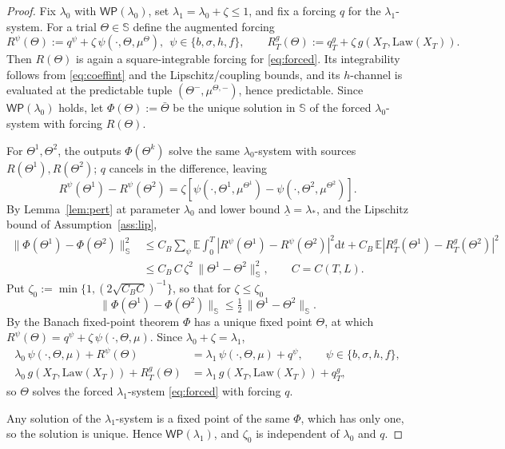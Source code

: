 \documentclass[preprint,12pt]{elsarticle}
\newcommand{\E}{\mathbb{E}}
\newcommand{\diff}{\mathrm{d}}
\newcommand{\Law}{\mathrm{Law}}
\newcommand{\HH}{\mathbb{S}}
\numberwithin{equation}{section}
\theoremstyle{plain}
\theoremstyle{definition}
\theoremstyle{\PaperRemarkStyle}
\begin{document}
\begin{proof}
Fix $\lambda_0$ with $\mathsf{WP}(\lambda_0)$, set $\lambda_1=\lambda_0+\zeta\le1$, and
fix a forcing $q$ for the $\lambda_1$-system. For a trial $\Theta\in\HH$ define the
augmented forcing
\[
R^\psi(\Theta):=q^\psi+\zeta\,\psi(\cdot,\Theta,\mu^\Theta),\ \ \psi\in\{b,\sigma,h,f\},
\qquad R^g_T(\Theta):=q^g_T+\zeta\,g(X_T,\Law(X_T)).
\]
Then $R(\Theta)$ is
again a square-integrable forcing for \eqref{eq:forced}. Its integrability follows from
\eqref{eq:coeffint} and the Lipschitz/coupling bounds, and its $h$-channel is evaluated at
the predictable tuple $(\Theta^-,\mu^{\Theta,-})$, hence predictable.
Since $\mathsf{WP}(\lambda_0)$ holds, let $\Phi(\Theta):=\bar\Theta$ be the unique
solution in $\HH$ of the forced $\lambda_0$-system with forcing $R(\Theta)$.

For $\Theta^1,\Theta^2$, the outputs $\Phi(\Theta^k)$ solve the same $\lambda_0$-system
with sources $R(\Theta^1),R(\Theta^2)$; $q$ cancels in the difference, leaving
\[
R^\psi(\Theta^1)-R^\psi(\Theta^2)=\zeta[\psi(\cdot,\Theta^1,\mu^{\Theta^1})-\psi(\cdot,\Theta^2,\mu^{\Theta^2})].
\]
By Lemma~\ref{lem:pert} at parameter $\lambda_0$ and lower bound
$\underline\lambda=\lambda_*$, and the
Lipschitz bound of Assumption~\ref{ass:lip},
\[
\begin{aligned}
\|\Phi(\Theta^1)-\Phi(\Theta^2)\|_{\HH}^2
&\le C_B\!\sum_\psi\E\!\int_0^T|R^\psi(\Theta^1)-R^\psi(\Theta^2)|^2\diff t
+C_B\,\E|R^g_T(\Theta^1)-R^g_T(\Theta^2)|^2\\
&\le C_B\,C\,\zeta^2\,\|\Theta^1-\Theta^2\|_{\HH}^2 ,\qquad C=C(T,L) .
\end{aligned}
\]
Put $\zeta_0:=\min\{1,(2\sqrt{C_BC})^{-1}\}$, so that for $\zeta\le\zeta_0$
\[
\|\Phi(\Theta^1)-\Phi(\Theta^2)\|_{\HH}\le\tfrac12\,\|\Theta^1-\Theta^2\|_{\HH} .
\]
By the Banach fixed-point theorem $\Phi$ has a unique fixed point $\Theta$, at which
$R^\psi(\Theta)=q^\psi+\zeta\,\psi(\cdot,\Theta,\mu)$. Since $\lambda_0+\zeta=\lambda_1$,
\[
\begin{aligned}
\lambda_0\,\psi(\cdot,\Theta,\mu)+R^\psi(\Theta)&=\lambda_1\,\psi(\cdot,\Theta,\mu)+q^\psi ,
\qquad\psi\in\{b,\sigma,h,f\},\\
\lambda_0\,g(X_T,\Law(X_T))+R^g_T(\Theta)&=\lambda_1\,g(X_T,\Law(X_T))+q^g_T ,
\end{aligned}
\]
so $\Theta$ solves the forced $\lambda_1$-system \eqref{eq:forced} with forcing $q$.

Any solution of the $\lambda_1$-system is a fixed point of the same $\Phi$, which has only
one, so the solution is unique. Hence $\mathsf{WP}(\lambda_1)$, and $\zeta_0$ is
independent of $\lambda_0$ and $q$.
\end{proof}
\end{document}
